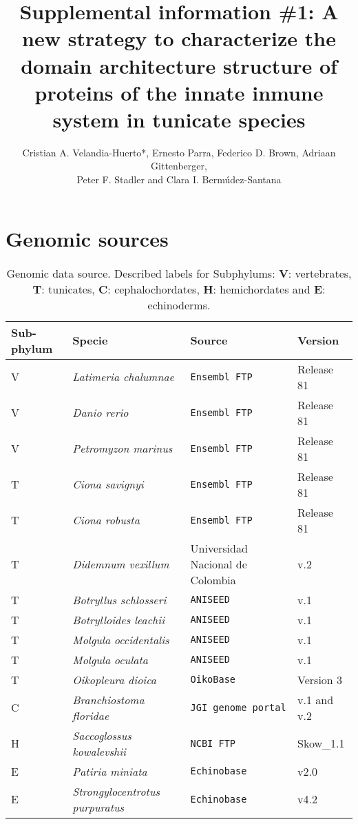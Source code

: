 \documentclass[12pt]{article}
\title{Supplemental information \#1: A new strategy to characterize the domain 
architecture structure of proteins of the innate inmune system in tunicate 
species}
\author{Cristian A. Velandia-Huerto*, Ernesto Parra, Federico D. 
Brown, Adriaan Gittenberger, \\ Peter F. Stadler and Clara I. 
Berm\'{u}dez-Santana}
\begin{document}
\maketitle

\section*{Genomic sources}
\begin{table}[ht!]
\centering
\begin{tabular}{p{2cm}p{5.6cm}p{5.5cm}l}
\toprule
\textbf{Sub-phylum} & \textbf{Specie} & \textbf{Source} & \textbf{Version} \\ 
\midrule
V & \textit{Latimeria chalumnae} & \texttt{Ensembl FTP}\footnotemark[1] & 
Release 81 \\
V & \textit{Danio rerio} & \texttt{Ensembl FTP}\footnotemark[2] & Release 81 \\
V & \textit{Petromyzon marinus} & \texttt{Ensembl FTP}\footnotemark[3] & 
Release 81 \\
\midrule
T & \textit{Ciona savignyi} & \texttt{Ensembl FTP}\footnotemark[4] & Release 81 
\\
T & \textit{Ciona robusta} & \texttt{Ensembl FTP}\footnotemark[5] & Release 81 
\\
T & \textit{Didemnum vexillum} & Universidad Nacional de Colombia\footnotemark[8] & v.2 \\
T & \textit{Botryllus schlosseri} & \texttt{ANISEED}\footnotemark[9] & v.1 \\
T & \textit{Botrylloides leachii} & \texttt{ANISEED}\footnotemark[10] & v.1 \\
T &\textsl{Molgula occidentalis} & \texttt{ANISEED}\footnotemark[11] & v.1 \\
T &\textsl{Molgula oculata} & \texttt{ANISEED}\footnotemark[12] & v.1 \\
T & \textit{Oikopleura dioica} & \texttt{OikoBase}\footnotemark[13] & Version 3 \\
\midrule
C & \textit{Branchiostoma floridae} & \texttt{JGI genome 
portal}\footnotemark[14] & v.1 and v.2 \\
\midrule
H & \textit{Saccoglossus kowalevshii} & \texttt{NCBI FTP}\footnotemark[15] & 
Skow\_1.1 \\
E & \textit{Patiria miniata} & \texttt{Echinobase}\footnotemark[16] & v2.0 \\
E & \textit{Strongylocentrotus purpuratus} & 
\texttt{Echinobase}\footnotemark[17] & v4.2 \\
\bottomrule
\end{tabular}
\caption{Genomic data source. Described labels for Subphylums: \textbf{V}: 
vertebrates,  \textbf{T}: tunicates, \textbf{C}: cephalochordates, \textbf{H}: 
hemichordates and \textbf{E}: echinoderms.}\label{table:source}
\end{table}
\end{document}
